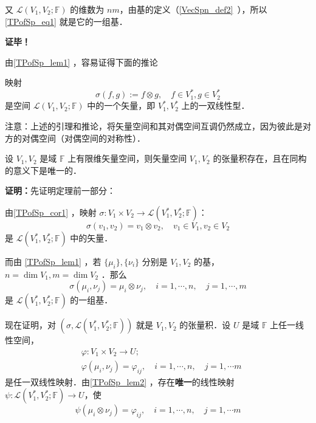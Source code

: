 又 $\mathcal L(V_1,V_2;\mathbb F)$ 的维数为 $nm$，由基的定义（\autoref{VecSpn_def2}~），所以\autoref{TPofSp_eq1} 就是它的一组基．

\textbf{证毕！}

由\autoref{TPofSp_lem1} ，容易证得下面的推论
\begin{corollary}{}\label{TPofSp_cor1}
映射
\begin{equation}
\sigma(f,g):=f\otimes g,\quad f\in V_1^*,g\in V_2^*
\end{equation}
是空间 $\mathcal L(V_1,V_2;\mathbb F)$ 中的一个矢量，即 $V_1^*,V_2^*$ 上的一双线性型．
\end{corollary}
注意：上述的引理和推论，将矢量空间和其对偶空间互调仍然成立，因为彼此是对方的对偶空间（对偶空间的对称性）．

\begin{theorem}{}\label{TPofSp_the1}
设 $V_1,V_2$ 是域 $\mathbb F$ 上有限维矢量空间，则矢量空间 $V_1,V_2$ 的张量积存在，且在同构的意义下是唯一的．
\end{theorem}
\textbf{证明：}先证明定理前一部分：

由\autoref{TPofSp_cor1} ，映射 $\sigma:V_1\times V_2\rightarrow\mathcal L(V_1^*,V_2^*;\mathbb F) $：
\begin{equation}\label{TPofSp_eq7}
\sigma(v_1,v_2)=v_1\otimes v_2,\quad v_1\in V_1,v_2\in V_2 
\end{equation}
是  $\mathcal L(V_1^*,V_2^*;\mathbb F)$ 中的矢量．

而由 \autoref{TPofSp_lem1} ，若 $\{\mu_i\},\{\nu_i\}$ 分别是 $V_1,V_2$ 的基，$n=\dim V_1,m=\dim V_2$ ．那么
\begin{equation}\label{TPofSp_eq2}
\sigma(\mu_i,\nu_j)=\mu_i\otimes \nu_j,\quad i=1,\cdots,n,\quad j=1,\cdots,m
\end{equation}
是 $\mathcal L(V_1^*,V_2^*;\mathbb F)$ 的一组基．

现在证明，对 $(\sigma,\mathcal L(V_1^*,V_2^*;\mathbb F))$ 就是 $V_1,V_2$ 的张量积．设 $U$ 是域 $\mathbb F$ 上任一线性空间，
\begin{equation}\label{TPofSp_eq3}
\begin{aligned}
&\varphi:V_1\times V_2\rightarrow U;\\
&\varphi(\mu_i,\nu_j)=\varphi_{ij},\quad i=1,\cdots,n,\quad j=1,\cdots m
\end{aligned}
\end{equation}
是任一双线性映射．由\autoref{TPofSp_lem2} ，存在\textbf{唯一}的线性映射 $\psi:\mathcal L(V_1^*,V_2^*;\mathbb F)\rightarrow U$，使
\begin{equation}\label{TPofSp_eq4}
\psi(\mu_i\otimes \nu_j)=\varphi_{ij},\quad i=1,\cdots,n,\quad j=1,\cdots m
\end{equation}

